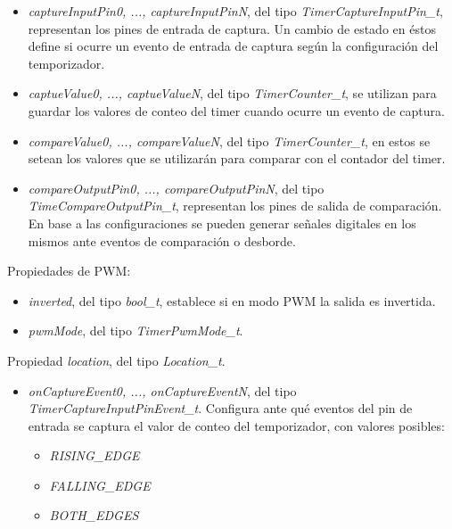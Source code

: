 \begin{itemize}
\item
\emph{captureInputPin0, ..., captureInputPinN}, del tipo \emph{TimerCaptureInputPin\_t}, representan los pines de entrada de captura. Un cambio de estado en éstos define si ocurre un evento de entrada de captura según la configuración del temporizador.
\item
\emph{captueValue0, ..., captueValueN}, del tipo \emph{TimerCounter\_t}, se utilizan para guardar los valores de conteo del timer cuando ocurre un evento de captura.
\item
\emph{compareValue0, ..., compareValueN}, del tipo \emph{TimerCounter\_t}, en estos se setean los valores que se utilizarán para comparar con el contador del timer.
\item
\emph{compareOutputPin0, ..., compareOutputPinN}, del tipo \emph{TimeCompareOutputPin\_t}, representan los pines de salida de comparación. En base a las configuraciones se pueden generar señales digitales en los mismos ante eventos de comparación o desborde.
\end{itemize}

Propiedades de PWM:

\begin{itemize}
\item
\emph{inverted}, del tipo \emph{bool\_t}, establece si en modo PWM la salida es invertida.
\item
\emph{pwmMode}, del tipo \emph{\emph{TimerPwmMode\_t}}.
\end{itemize}

Propiedad \emph{location}, del tipo \emph{Location\_t}.


\begin{itemize}
\item
\emph{onCaptureEvent0, ..., onCaptureEventN}, del tipo \emph{TimerCaptureInputPinEvent\_t}. Configura ante qué eventos del pin de entrada se captura el valor de conteo del temporizador, con valores posibles:
\begin{itemize}
\item \emph{RISING\_EDGE}
\item \emph{FALLING\_EDGE}
\item \emph{BOTH\_EDGES}
\end{itemize}
\end{itemize}


